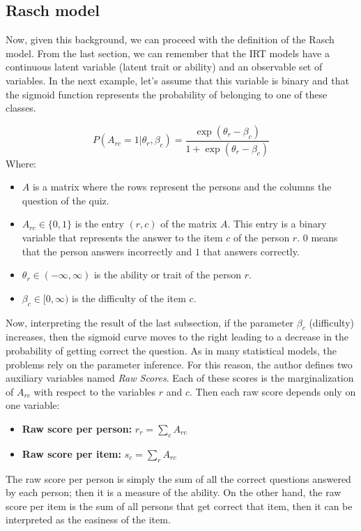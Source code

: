 \subsection{Rasch model}
Now, given this background, we can proceed with the definition of the Rasch model. From the last section, we can remember that the IRT models have a continuous latent variable (latent trait or ability) and an observable set of variables. In the next example, let's assume that this variable is binary and that the sigmoid function represents the probability of belonging to one of these classes.

\begin{equation}
  P(A_{rc} = 1 | \theta_r, \beta_c) = \frac{\exp(\theta_r - \beta_c)}{1+\exp(\theta_r - \beta_c)}
\end{equation}
Where:
\begin{itemize}
\item{$A$ is a matrix where the rows represent the persons and the columns the question of the quiz.}
\item{$A_{rc} \in \{0,1\}$ is the entry $(r,c)$ of the matrix $A$. This entry is a binary variable that represents the answer to the item $c$ of the person $r$. $0$ means that the person answers incorrectly and $1$ that answers correctly.}
\item{$\theta_r \in (-\infty, \infty)$ is the ability or trait of the person $r$.}
\item{$\beta_c \in [0, \infty)$ is the difficulty of the item $c$.}
\end{itemize}

Now, interpreting the result of the last subsection, if the parameter $\beta_c$ (difficulty) increases, then the sigmoid curve moves to the right leading to a decrease in the probability of getting correct the question. As in many statistical models, the problems rely on the parameter inference. For this reason, the author defines two auxiliary variables named \textit{Raw Scores}. Each of these scores is the marginalization of $A_{rc}$ with respect to the variables $r$ and $c$. Then each raw score depends only on one variable:

\begin{itemize}
\item{\textbf{Raw score per person:} $r_r = \sum_c A_{rc}$}
\item{\textbf{Raw score per item:} $s_c = \sum_r A_{rc}$}
\end{itemize}

The raw score per person is simply the sum of all the correct questions answered by each person; then it is a measure of the ability. On the other hand, the raw score per item is the sum of all persons that get correct that item, then it can be interpreted as the easiness of the item.

